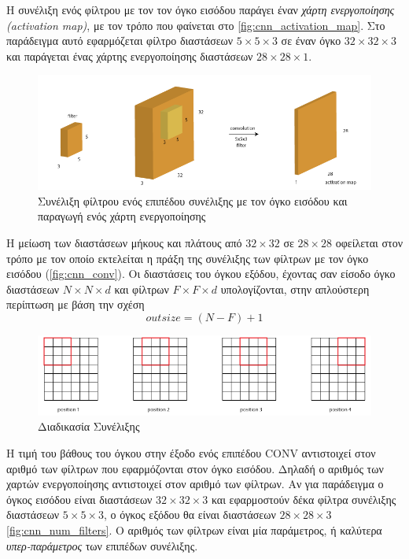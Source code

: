 Η συνέλιξη ενός φίλτρου με τον τον όγκο εισόδου παράγει έναν \emph{χάρτη ενεργοποίησης (activation map)},
με τον τρόπο που φαίνεται στο \autoref{fig:cnn_activation_map}. Στο παράδειγμα αυτό
εφαρμόζεται φίλτρο διαστάσεων $5\times5\times3$ σε έναν όγκο $32 \times 32 \times 3$ και παράγεται
ένας χάρτης ενεργοποίησης διαστάσεων $28\times28\times1$.

\begin{figure}[!ht]
  \centering
  \includegraphics[width=1\textwidth]{./images/chapter3/cnn_activation_map.png}
  \caption[Συνέλιξη φίλτρου ενός επιπέδου συνέλιξης με τον όγκο εισόδου και παραγωγή ενός χάρτη ενεργοποίησης]{Συνέλιξη φίλτρου ενός επιπέδου συνέλιξης με τον όγκο εισόδου και παραγωγή ενός χάρτη ενεργοποίησης}
  \label{fig:cnn_activation_map}
\end{figure}

Η μείωση των διαστάσεων μήκους και πλάτους από $32 \times 32$ σε $28 \times 28$ οφείλεται στον τρόπο με τον οποίο
εκτελείται η πράξη της συνέλιξης των φίλτρων με τον όγκο εισόδου  (\autoref{fig:cnn_conv}).
Οι διαστάσεις του όγκου εξόδου, έχοντας σαν είσοδο όγκο διαστάσεων $N \times N \times d$ και φίλτρων $F \times F \times d$ υπολογίζονται, στην απλούστερη περίπτωση με βάση την σχέση
\begin{equation*}
  outsize = (N-F) + 1
\end{equation*}


\begin{figure}[!ht]
  \centering
  \includegraphics[width=1\textwidth]{./images/chapter3/cnn_conv.png}
  \caption[Διαδικασία Συνέλιξης]{Διαδικασία Συνέλιξης}
  \label{fig:cnn_conv}
\end{figure}

Η τιμή του βάθους του όγκου στην έξοδο ενός επιπέδου CONV αντιστοιχεί στον αριθμό των φίλτρων που
εφαρμόζονται στον όγκο εισόδου. Δηλαδή ο αριθμός των χαρτών ενεργοποίησης
αντιστοιχεί στον αριθμό των φίλτρων. Αν για παράδειγμα ο όγκος εισόδου είναι
διαστάσεων $32 \times 32 \times 3$ και εφαρμοστούν δέκα φίλτρα συνέλιξης διαστάσεων $5\times5\times3$,
ο όγκος εξόδου θα είναι διαστάσεων $28\times28\times3$ \autoref{fig:cnn_num_filters}.
Ο αριθμός των φίλτρων είναι μία παράμετρος, ή καλύτερα \emph{υπερ-παράμετρος} των επιπέδων συνέλιξης.

